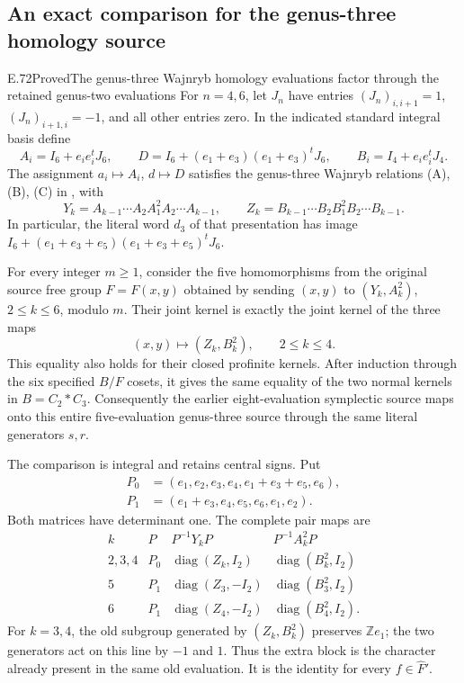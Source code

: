 \subsection{An exact comparison for the genus-three homology source}
\begin{statement}{E.72}{Proved}{The genus-three Wajnryb homology evaluations factor through the retained genus-two evaluations}
For $n=4,6$, let $J_n$ have entries $(J_n)_{i,i+1}=1$,
$(J_n)_{i+1,i}=-1$, and all other entries zero.  In the indicated
standard integral basis define
\[
 A_i=I_6+e_i e_i^tJ_6,\qquad
 D=I_6+(e_1+e_3)(e_1+e_3)^tJ_6,
 \qquad
 B_i=I_4+e_i e_i^tJ_4.
 \tag{E.72.1}
\]
The assignment $a_i\mapsto A_i$, $d\mapsto D$ satisfies the
genus-three Wajnryb relations (A), (B), (C) in
\cite[Theorem 3.1]{DE_LochakNakamuraSchneps2026}, with
\[
 Y_k=A_{k-1}\cdots A_2 A_1^2 A_2\cdots A_{k-1},
 \qquad
 Z_k=B_{k-1}\cdots B_2 B_1^2 B_2\cdots B_{k-1}.
 \tag{E.72.2}
\]
In particular, the literal word $d_3$ of that presentation has image
$I_6+(e_1+e_3+e_5)(e_1+e_3+e_5)^tJ_6$.

For every integer $m\geq1$, consider the five homomorphisms
from the original source free group $F=F(x,y)$ obtained by sending
$(x,y)$ to $(Y_k,A_k^2)$, $2\leq k\leq6$, modulo $m$.
Their joint kernel is exactly the joint kernel of the three maps
\[
       (x,y)\longmapsto (Z_k,B_k^2),\qquad 2\leq k\leq4.
 \tag{E.72.3}
\]
This equality also holds for their closed profinite kernels.
After induction through the six specified $B/F$ cosets, it gives
the same equality of the two normal kernels in $B=C_2*C_3$.
Consequently the earlier eight-evaluation symplectic source maps
onto this entire five-evaluation genus-three source through the
same literal generators $s,r$.

The comparison is integral and retains central signs.  Put
\[
\begin{split}
 P_0&=(e_1,e_2,e_3,e_4,e_1+e_3+e_5,e_6),\\
 P_1&=(e_1+e_3,e_4,e_5,e_6,e_1,e_2).
\end{split}
 \tag{E.72.4}
\]
Both matrices have determinant one.  The complete pair maps are
\[
\begin{array}{c|c|c|c}
 k&P& P^{-1}Y_kP&P^{-1}A_k^2P\\ \hline
 2,3,4&P_0&\operatorname{diag}(Z_k,I_2)&
                         \operatorname{diag}(B_k^2,I_2)\\
 5&P_1&\operatorname{diag}(Z_3,-I_2)&
                         \operatorname{diag}(B_3^2,I_2)\\
 6&P_1&\operatorname{diag}(Z_4,-I_2)&
                         \operatorname{diag}(B_4^2,I_2).
\end{array}
 \tag{E.72.5}
\]
For $k=3,4$, the old subgroup generated by $(Z_k,B_k^2)$ preserves
$\mathbb Z e_1$; the two generators act on this line by $-1$ and
$1$.  Thus the extra block is the character already present in
the same old evaluation.  It is the identity for every
$f\in\widehat F'$.


\end{statement}
